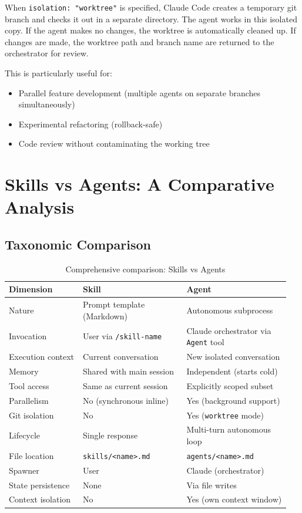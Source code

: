 \documentclass[11pt,letterpaper]{article}
\begin{document}
When \texttt{isolation: "worktree"} is specified, Claude Code creates a temporary git branch and checks it out in a separate directory. The agent works in this isolated copy. If the agent makes no changes, the worktree is automatically cleaned up. If changes are made, the worktree path and branch name are returned to the orchestrator for review.

This is particularly useful for:
\begin{itemize}[leftmargin=*]
    \item Parallel feature development (multiple agents on separate branches simultaneously)
    \item Experimental refactoring (rollback-safe)
    \item Code review without contaminating the working tree
\end{itemize}

\section{Skills vs Agents: A Comparative Analysis}

\subsection{Taxonomic Comparison}

\begin{table}[H]
\centering
\caption{Comprehensive comparison: Skills vs Agents}
\begin{tabular}{@{}p{0.25\linewidth}p{0.35\linewidth}p{0.35\linewidth}@{}}
\toprule
\textbf{Dimension} & \textbf{Skill} & \textbf{Agent} \\
\midrule
Nature & Prompt template (Markdown) & Autonomous subprocess \\
Invocation & User via \texttt{/skill-name} & Claude orchestrator via \texttt{Agent} tool \\
Execution context & Current conversation & New isolated conversation \\
Memory & Shared with main session & Independent (starts cold) \\
Tool access & Same as current session & Explicitly scoped subset \\
Parallelism & No (synchronous inline) & Yes (background support) \\
Git isolation & No & Yes (\texttt{worktree} mode) \\
Lifecycle & Single response & Multi-turn autonomous loop \\
File location & \texttt{skills/<name>.md} & \texttt{agents/<name>.md} \\
Spawner & User & Claude (orchestrator) \\
State persistence & None & Via file writes \\
Context isolation & No & Yes (own context window) \\
\bottomrule
\end{tabular}
\end{table}
\end{document}
